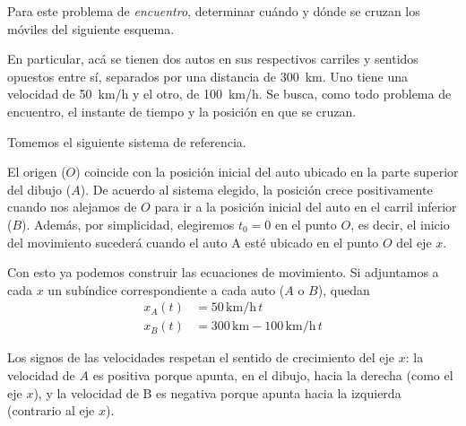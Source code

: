 \begin{mdframed}[style=ExampleFrame]
    \begin{example}
    \end{example}
    \begin{formatI}
        Para este problema de \emph{encuentro}, determinar cuándo y dónde se cruzan los móviles del siguiente esquema.
    \end{formatI}
    
    \begin{center}
        \def\svgwidth{\linewidth}
        
    \end{center}
    
    En particular, acá se tienen dos autos en sus respectivos carriles y sentidos opuestos entre sí, separados por una distancia de \SI{300}{\kilo\meter}.
    Uno tiene una velocidad de \SI{50}{\kilo\meter/\hour} y el otro, de \SI{100}{\kilo\meter/\hour}.
    Se busca, como todo problema de encuentro, el instante de tiempo y la posición en que se cruzan.
    
    Tomemos el siguiente sistema de referencia.
    
    \begin{center}
        \def\svgwidth{\linewidth}
        
    \end{center}
    
    El origen ($O$) coincide con la posición inicial del auto ubicado en la parte superior del dibujo ($A$).
    De acuerdo al sistema elegido, la posición crece positivamente cuando nos alejamos de $O$ para ir a la posición inicial del auto en el carril inferior ($B$).
    Además, por simplicidad, elegiremos $t_0 = 0$ en el punto $O$, es decir, el inicio del movimiento sucederá cuando el auto A esté ubicado en el punto $O$ del eje $x$.
    
    Con esto ya podemos construir las ecuaciones de movimiento.
    Si adjuntamos a cada $x$ un subíndice correspondiente a cada auto ($A$ o $B$), quedan
    \begin{align*}
        x_A(t) &= 50\,\si{\kilo\metre\per\hour} \, t
        \\
        x_B(t) &= 300\,\si{\kilo\metre} - 100\,\si{\kilo\metre\per\hour} \, t
    \end{align*}
    
    Los signos de las velocidades respetan el sentido de crecimiento del eje $x$: la velocidad de $A$ es positiva porque apunta, en el dibujo, hacia la derecha (como el eje $x$), y la velocidad de B es negativa porque apunta hacia la izquierda (contrario al eje $x$).
    

\end{mdframed}

